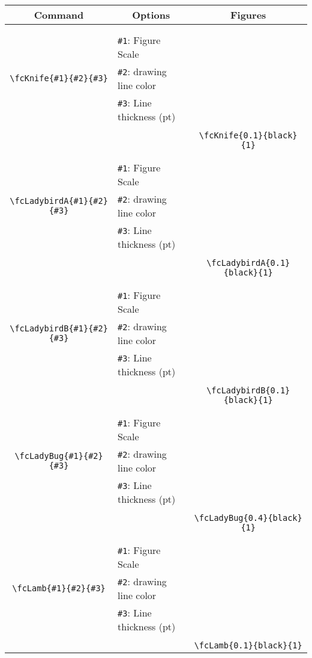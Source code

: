 \documentclass[x11names]{article}
\begin{document}
\begin{table}[H]\centering\begin{tabular}{|c|l|c|}\hline {\bf Command}& \multicolumn{1}{c|}{{\bf Options}} & {\bf Figures}\\  \hline	&&\multirow{5}{*}{\fcKnife{0.1}{black}{1}}\\	&&\\	&\verb|#1|: Figure Scale &\\	\verb|\fcKnife{#1}{#2}{#3}|&	\verb|#2|: drawing line color &\\	&\verb|#3|: Line thickness (pt) &\\ &&\\&&	\verb|\fcKnife{0.1}{black}{1}|\\\hline 	
	&&\multirow{5}{*}{\fcLadybirdA{0.1}{black}{1}}\\	&&\\	&\verb|#1|: Figure Scale &\\	\verb|\fcLadybirdA{#1}{#2}{#3}|&	\verb|#2|: drawing line color &\\	&\verb|#3|: Line thickness (pt) &\\ &&\\&&	\verb|\fcLadybirdA{0.1}{black}{1}|\\\hline 	
	&&\multirow{5}{*}{\fcLadybirdB{0.1}{black}{1}}\\	&&\\	&\verb|#1|: Figure Scale &\\	\verb|\fcLadybirdB{#1}{#2}{#3}|&	\verb|#2|: drawing line color &\\	&\verb|#3|: Line thickness (pt) &\\ &&\\&&	\verb|\fcLadybirdB{0.1}{black}{1}|\\\hline 	
	&&\multirow{5}{*}{\fcLadyBug{0.4}{black}{1}}\\	&&\\	&\verb|#1|: Figure Scale &\\	\verb|\fcLadyBug{#1}{#2}{#3}|&	\verb|#2|: drawing line color &\\	&\verb|#3|: Line thickness (pt) &\\ &&\\&&	\verb|\fcLadyBug{0.4}{black}{1}|\\\hline 	
	&&\multirow{5}{*}{\fcLamb{0.1}{black}{1}}\\	&&\\	&\verb|#1|: Figure Scale &\\	\verb|\fcLamb{#1}{#2}{#3}|&	\verb|#2|: drawing line color &\\	&\verb|#3|: Line thickness (pt) &\\ &&\\&&	\verb|\fcLamb{0.1}{black}{1}|\\\hline 	

\end{tabular}
\end{table}
\end{document}
